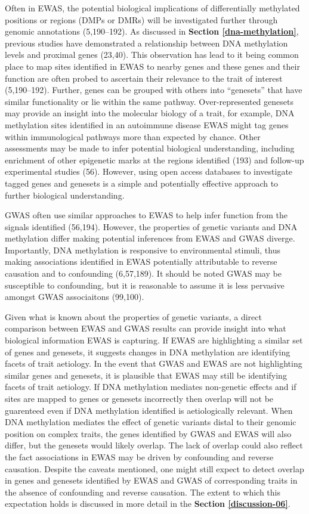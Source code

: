 \documentclass[11pt,oneside]{bristolthesis}
\begin{document}
Often in EWAS, the potential biological implications of differentially methylated positions or regions (DMPs or DMRs) will be investigated further through genomic annotations (5,190--192). As discussed in \textbf{Section \ref{dna-methylation}}, previous studies have demonstrated a relationship between DNA methylation levels and proximal genes (23,40). This observation has lead to it being common place to map sites identified in EWAS to nearby genes and these genes and their function are often probed to ascertain their relevance to the trait of interest (5,190--192). Further, genes can be grouped with others into ``genesets'' that have similar functionality or lie within the same pathway. Over-represented genesets may provide an insight into the molecular biology of a trait, for example, DNA methylation sites identified in an autoimmune disease EWAS might tag genes within immunological pathways more than expected by chance. Other assessments may be made to infer potential biological understanding, including enrichment of other epigenetic marks at the regions identified (193) and follow-up experimental studies (56). However, using open access databases to investigate tagged genes and genesets is a simple and potentially effective approach to further biological understanding.

GWAS often use similar approaches to EWAS to help infer function from the signals identified (56,194). However, the properties of genetic variants and DNA methylation differ making potential inferences from EWAS and GWAS diverge. Importantly, DNA methylation is responsive to environmental stimuli, thus making associations identified in EWAS potentially attributable to reverse causation and to confounding (6,57,189). It should be noted GWAS may be susceptible to confounding, but it is reasonable to assume it is less pervasive amongst GWAS associaitons (99,100).

Given what is known about the properties of genetic variants, a direct comparison between EWAS and GWAS results can provide insight into what biological information EWAS is capturing. If EWAS are highlighting a similar set of genes and genesets, it suggests changes in DNA methylation are identifying facets of trait aetiology. In the event that GWAS and EWAS are not highlighting similar genes and genesets, it is plausible that EWAS may still be identifying facets of trait aetiology. If DNA methylation mediates non-genetic effects and if sites are mapped to genes or genesets incorrectly then overlap will not be guarenteed even if DNA methylation identified is aetiologically relevant. When DNA methylation mediates the effect of genetic variants distal to their genomic position on complex traits, the genes identified by GWAS and EWAS will also differ, but the genesets would likely overlap. The lack of overlap could also reflect the fact associations in EWAS may be driven by confounding and reverse causation. Despite the caveats mentioned, one might still expect to detect overlap in genes and genesets identified by EWAS and GWAS of corresponding traits in the absence of confounding and reverse causation. The extent to which this expectation holds is discussed in more detail in the \textbf{Section \ref{discussion-06}}.
\end{document}
